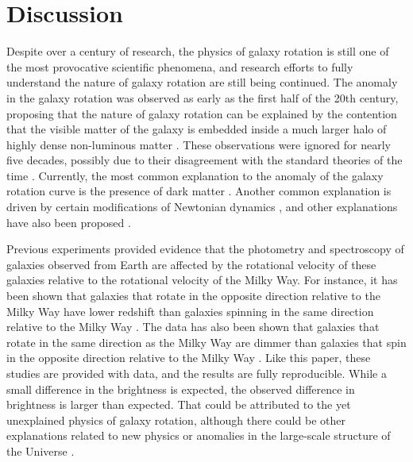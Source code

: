 \documentclass[final,5p,times,twocolumn]{article}
\begin{document}
\section{Discussion}
\label{discussion}


Despite over a century of research, the physics of galaxy rotation is still one of the most provocative scientific phenomena, and research efforts to fully understand the nature of galaxy rotation are still being continued. The anomaly in the galaxy rotation was observed as early as the first half of the 20th century, proposing that the nature of galaxy rotation can be explained by the contention that the visible matter of the galaxy is embedded inside a much larger halo of highly dense non-luminous matter \citep{oort1940some}. These observations were ignored for nearly five decades, possibly due to their disagreement with the standard theories of the time \citep{rubin2000one}. Currently, the most common explanation to the anomaly of the galaxy rotation curve is the presence of dark matter \citep{rubin1983rotation}. Another common explanation is driven by certain modifications of Newtonian dynamics \citep{milgrom1983modification,bekenstein1984does,milgrom2009bimetric,falcon2021large}, and other explanations have also been proposed \citep{sanders1990mass,capozziello2012dark,chadwick2013gravitational,farnes2018unifying,rivera2020alternative,nagao2020galactic,sivaram2020mond,blake2021relativistic,gomel2021effects,skordis2021new,larin2022towards}.


Previous experiments provided evidence that the photometry and spectroscopy of galaxies observed from Earth are affected by the rotational velocity of these galaxies relative to the rotational velocity of the Milky Way. For instance, it has been shown that galaxies that rotate in the opposite direction relative to the Milky Way have lower redshift than galaxies spinning in the same direction relative to the Milky Way \citep{universe10030129,shamir2024empirical}. The data has also been shown that galaxies that rotate in the same direction as the Milky Way are dimmer than galaxies that spin in the opposite direction relative to the Milky Way \citep{shamir2020asymmetry,mcadam2023asymmetry}. Like this paper, these studies are provided with data, and the results are fully reproducible. While a small difference in the brightness is expected, the observed difference in brightness is larger than expected. That could be attributed to the yet unexplained physics of galaxy rotation, although there could be other explanations related to new physics or anomalies in the large-scale structure of the Universe \citep{shamir2020asymmetry,mcadam2023asymmetry}. 
\end{document}
